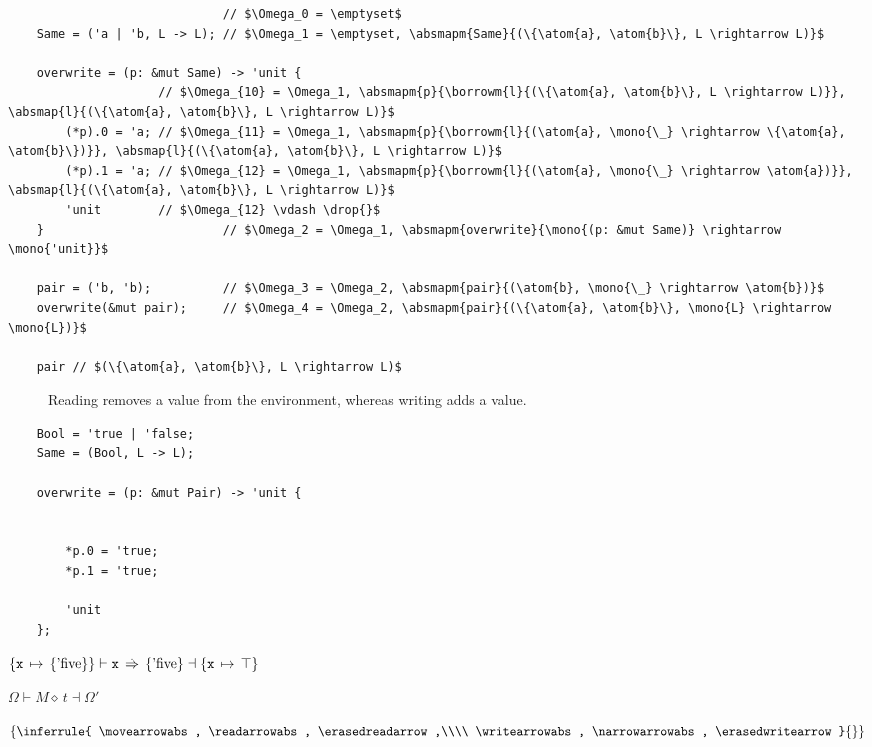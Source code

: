 \documentclass[12pt,twoside]{report}
\begin{document}
\begin{listing}[H]
    \begin{verbatim}
                              // $\Omega_0 = \emptyset$
    Same = ('a | 'b, L -> L); // $\Omega_1 = \emptyset, \absmapm{Same}{(\{\atom{a}, \atom{b}\}, L \rightarrow L)}$

    overwrite = (p: &mut Same) -> 'unit {
                     // $\Omega_{10} = \Omega_1, \absmapm{p}{\borrowm{l}{(\{\atom{a}, \atom{b}\}, L \rightarrow L)}}, \absmap{l}{(\{\atom{a}, \atom{b}\}, L \rightarrow L)}$
        (*p).0 = 'a; // $\Omega_{11} = \Omega_1, \absmapm{p}{\borrowm{l}{(\atom{a}, \mono{\_} \rightarrow \{\atom{a}, \atom{b}\})}}, \absmap{l}{(\{\atom{a}, \atom{b}\}, L \rightarrow L)}$
        (*p).1 = 'a; // $\Omega_{12} = \Omega_1, \absmapm{p}{\borrowm{l}{(\atom{a}, \mono{\_} \rightarrow \atom{a})}}, \absmap{l}{(\{\atom{a}, \atom{b}\}, L \rightarrow L)}$
        'unit        // $\Omega_{12} \vdash \drop{}$
    }                         // $\Omega_2 = \Omega_1, \absmapm{overwrite}{\mono{(p: &mut Same)} \rightarrow \mono{'unit}}$

    pair = ('b, 'b);          // $\Omega_3 = \Omega_2, \absmapm{pair}{(\atom{b}, \mono{\_} \rightarrow \atom{b})}$
    overwrite(&mut pair);     // $\Omega_4 = \Omega_2, \absmapm{pair}{(\{\atom{a}, \atom{b}\}, \mono{L} \rightarrow \mono{L})}$

    pair // $(\{\atom{a}, \atom{b}\}, L \rightarrow L)$
    \end{verbatim}
\end{listing}

\begin{figure}
    \begin{mathpar}
  
    \end{mathpar}
    \caption{Reading removes a value from the environment, whereas writing adds a value.}
    \label{fig:readvswrite}
\end{figure}

\begin{verbatim}
    Bool = 'true | 'false;
    Same = (Bool, L -> L);

    overwrite = (p: &mut Pair) -> 'unit {


        *p.0 = 'true;
        *p.1 = 'true;

        'unit
    };
\end{verbatim}

$\{ \absmapm{x}{\{\atom{five}\}} \} \vdash \mono{x} \movearrowabs \{\atom{five}\} \dashv \{ \absmapm{x}{\top} \}$

$\Omega \vdash M \diamond \, t \dashv \Omega'$

$\left\{
\inferrule{
    \movearrowabs, \readarrowabs, \erasedreadarrow,\\\\
    \writearrowabs, \narrowarrowabs, \erasedwritearrow
}{}
\right\}$
\end{document}
